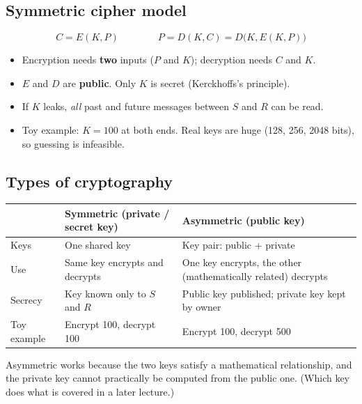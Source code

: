 \documentclass[10pt,a4paper]{article}
\begin{document}
\subsection{Symmetric cipher model}
\begin{center}
\end{center}
\[
C = E(K, P) \qquad\qquad P = D(K, C) = D\big(K, E(K,P)\big)
\]
\begin{itemize}
  \item Encryption needs \textbf{two} inputs ($P$ and $K$); decryption needs $C$ and $K$.
  \item $E$ and $D$ are \textbf{public}. Only $K$ is secret (Kerckhoffs's principle).
  \item If $K$ leaks, \emph{all} past and future messages between $S$ and $R$ can be read.
  \item Toy example: $K = 100$ at both ends. Real keys are huge (128, 256, 2048 bits), so guessing is infeasible.
\end{itemize}

\subsection{Types of cryptography}
\begin{center}
\small
\begin{tabularx}{\textwidth}{@{}l X X@{}}
\toprule
 & \textbf{Symmetric} (private / secret key) & \textbf{Asymmetric} (public key) \\
\midrule
Keys & One shared key & Key pair: public + private \\
Use & Same key encrypts and decrypts & One key encrypts, the other (mathematically related) decrypts \\
Secrecy & Key known only to $S$ and $R$ & Public key published; private key kept by owner \\
Toy example & Encrypt 100, decrypt 100 & Encrypt 100, decrypt 500 \\
\bottomrule
\end{tabularx}
\end{center}
Asymmetric works because the two keys satisfy a mathematical relationship, and the private key cannot practically be computed from the public one. (Which key does what is covered in a later lecture.)
\end{document}

